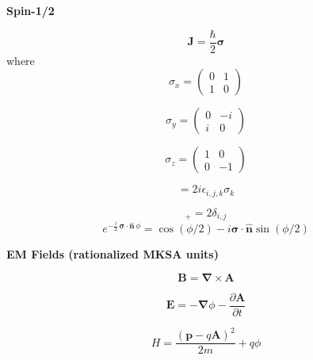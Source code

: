 \documentclass[11pt]{article}
\newcommand{\vect}[1]{\boldsymbol{\mathbf{#1}}}
\begin{document}
\begin{multicols}{2}
{\bf Spin-1/2}

\begin{equation}
\vect{J} = \frac{\hbar}{2} \vect{\sigma}
\end{equation}
where
\begin{equation}
\sigma_x = \left(
           \begin{array}{cc}
              0 & 1 \\
              1 & 0 
           \end{array}
           \right)
\end{equation}

\begin{equation}
\sigma_y = \left(
           \begin{array}{cc}
              0 & -i \\
              i & 0 
           \end{array}
           \right)
\end{equation}

\begin{equation}
\sigma_z = \left(
           \begin{array}{cc}
              1 & 0 \\
              0 & -1 
           \end{array}
           \right)
\end{equation}

\begin{equation}
[ \sigma_i, \sigma_j ] = 2i \epsilon_{i,j,k} \sigma_k
\end{equation}

\begin{equation}
[\,\sigma_i,\sigma_j\,]_+ = 2 \delta_{i,j}
\end{equation}
\begin{equation}
e^{- \frac{i}{2} \, \vect{\sigma} \cdot \vect{\hat{n}} \, \phi 
     }
  = \cos(\phi /2) - i \vect{\sigma} \cdot \vect{\hat{n}} \sin(\phi /2)
\end{equation}

{\bf EM Fields (rationalized MKSA units)}

\begin{equation}
\vect{B} = \vect{\nabla} \times \vect{A}
\end{equation}

\begin{equation}
\vect{E} = -\vect{\nabla} \phi - \frac{\partial \vect{A}}{\partial t}
\end{equation}

\begin{equation}
H = \frac{(\vect{p} - q \vect{A})^2}{2m} + q \phi
\end{equation}


\end{multicols}
\end{document}
